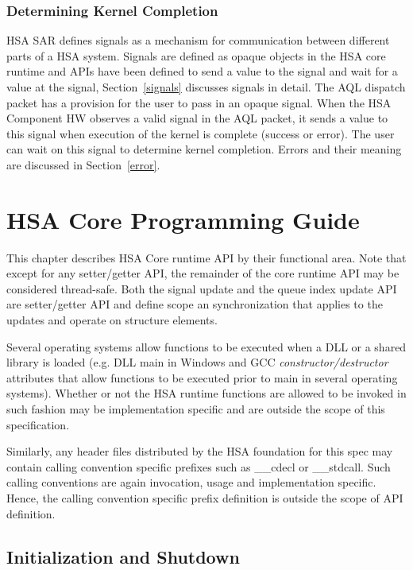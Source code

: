 \documentclass[draft]{book}
\newcommand{\mariotodo}[1]{\todo[color=CarnationPink]{#1}}
\begin{document}
\subsection{Determining Kernel Completion}
HSA SAR defines signals as a mechanism for communication between different parts
of a HSA system. Signals are defined as opaque objects in the HSA core runtime
and APIs have been defined to send a value to the signal and wait for a value at
the signal, Section~\ref{signals} discusses signals in detail. The AQL dispatch
packet has a provision for the user to pass in an opaque signal. When the HSA
Component HW observes a valid signal in the AQL packet, it sends a value to this
signal when execution of the kernel is complete (success or error). The user can
wait on this signal to determine kernel completion. Errors and their meaning are
discussed in Section~\ref{error}.



\chapter{HSA Core Programming Guide} \label{coreapi}

\mariotodo{Surreal intro}This chapter describes HSA Core runtime API by their
functional area. Note that except for any setter/getter API, the remainder of
the core runtime API may be considered thread-safe. Both the signal update and
the queue index update API are setter/getter API and define scope an
synchronization that applies to the updates and operate on structure elements.

Several operating systems allow functions to be executed when a DLL or a shared
library is loaded (e.g. DLL main in Windows and GCC
\emph{constructor/destructor} attributes that allow functions to be executed
prior to main in several operating systems). Whether or not the HSA runtime
functions are allowed to be invoked in such fashion may be implementation
specific and are outside the scope of this specification.

Similarly, any header files distributed by the HSA foundation for this spec may
contain calling convention specific prefixes such as __cdecl or
__stdcall. Such calling conventions are again invocation, usage and
implementation specific. Hence, the calling convention specific prefix
definition is outside the scope of API definition.

\section{Initialization and Shutdown}\label{init}
\end{document}
